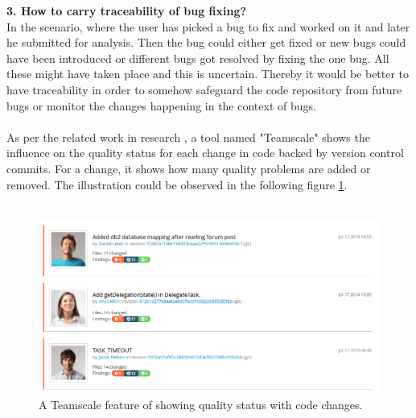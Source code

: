 \textbf{3. How to carry traceability of bug fixing?} \\

In the scenario, where the user has picked a bug to fix and worked on it and later he submitted for analysis. Then the bug could either get fixed or new bugs could have been introduced or different bugs got resolved by fixing the one bug. All these might have taken place and this is uncertain. Thereby it would be better to have traceability in order to somehow safeguard the code repository from future bugs or monitor the changes happening in the context of bugs. \\ \\

As per the related work in research \cite{heinemann2014teamscale}, a tool named "Teamscale" \cite{teamscale} shows the influence on the quality status for each change in code backed by version control commits. For a change, it shows how many quality problems are added or removed. The illustration could be observed in the following figure \ref{fig:teamscale}.\\ \\

\begin{figure}[hbt!]
	\centering
	\includegraphics[width=\linewidth]{figures/teamscale}
	\caption{A Teamscale feature of showing quality status with code changes.}
	\label{fig:teamscale}
\end{figure}

\let\cleardoublepage\clearpage

